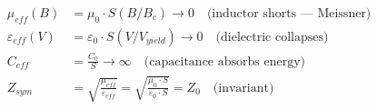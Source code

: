 %
\begin{align}
    \mu_{eff}(B)       &= \mu_0 \cdot S(B/B_c) \to 0
        \quad \text{(inductor shorts --- Meissner)} \label{eq:mu_eff_sat} \\[4pt]
    \varepsilon_{eff}(V) &= \varepsilon_0 \cdot S(V/V_{yield}) \to 0
        \quad \text{(dielectric collapses)} \label{eq:eps_eff_sat} \\[4pt]
    C_{eff}             &= \frac{C_0}{S} \to \infty
        \quad \text{(capacitance absorbs energy)} \label{eq:C_eff_sat} \\[4pt]
    Z_{sym}             &= \sqrt{\frac{\mu_{eff}}{\varepsilon_{eff}}}
                         = \sqrt{\frac{\mu_0 \cdot S}{\varepsilon_0 \cdot S}} = Z_0
        \quad \text{(invariant)} \label{eq:Z_sym_sat}
\end{align}
